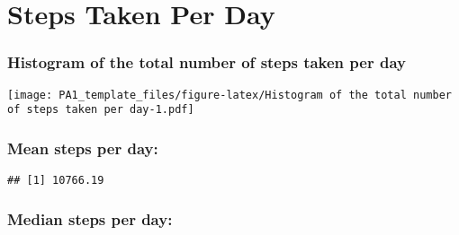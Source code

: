 \documentclass[
]{article}
\newenvironment{Shaded}{\begin{snugshade}}{\end{snugshade}}
\newcommand{\DataTypeTok}[1]{\textcolor[rgb]{0.13,0.29,0.53}{#1}}
\newcommand{\DecValTok}[1]{\textcolor[rgb]{0.00,0.00,0.81}{#1}}
\newcommand{\KeywordTok}[1]{\textcolor[rgb]{0.13,0.29,0.53}{\textbf{#1}}}
\newcommand{\NormalTok}[1]{#1}
\newcommand{\OperatorTok}[1]{\textcolor[rgb]{0.81,0.36,0.00}{\textbf{#1}}}
\newcommand{\OtherTok}[1]{\textcolor[rgb]{0.56,0.35,0.01}{#1}}
\newcommand{\StringTok}[1]{\textcolor[rgb]{0.31,0.60,0.02}{#1}}
\begin{document}
\hypertarget{steps-taken-per-day}{%
\section{Steps Taken Per Day}\label{steps-taken-per-day}}

\hypertarget{histogram-of-the-total-number-of-steps-taken-per-day}{%
\subsubsection{Histogram of the total number of steps taken per
day}\label{histogram-of-the-total-number-of-steps-taken-per-day}}

\begin{Shaded}
\end{Shaded}

\texttt{[image: PA1\_template\_files/figure-latex/Histogram of the total number of steps taken per day-1.pdf]}

\hypertarget{mean-steps-per-day}{%
\subsubsection{Mean steps per day:}\label{mean-steps-per-day}}

\begin{Shaded}
\end{Shaded}

\begin{verbatim}
## [1] 10766.19
\end{verbatim}

\hypertarget{median-steps-per-day}{%
\subsubsection{Median steps per day:}\label{median-steps-per-day}}
\end{document}
